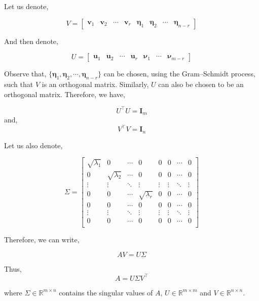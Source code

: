 \documentclass[a4paper]{article}
\begin{document}
Let us denote,

\begin{equation}
V = \begin{bmatrix}
\boldsymbol{v}_1 & \boldsymbol{v}_2 & \cdots & \boldsymbol{v}_r &  \boldsymbol{\eta}_1 & \boldsymbol{\eta}_2 & \cdots & \boldsymbol{\eta}_{n-r}
\end{bmatrix} 
\end{equation}

And then denote,

\begin{equation}
U = \begin{bmatrix}
\boldsymbol{u}_1 & \boldsymbol{u}_2 & \cdots & \boldsymbol{u}_r & \boldsymbol{\nu}_1 & \cdots & \boldsymbol{\nu}_{m-r}
\end{bmatrix}
\end{equation}

Observe that, $\{ \boldsymbol{\eta}_1, \boldsymbol{\eta}_2, \cdots, \boldsymbol{\eta}_{n-r} \}$ can be chosen, using the Gram–Schmidt process, such that $V$ is an orthogonal matrix. Similarly, $U$ can also be chosen to be an orthogonal matrix. Therefore, we have,

\begin{equation}
U^{\top}U = \boldsymbol{I}_m
\end{equation}
and,
\begin{equation}
V^{\top}V = \boldsymbol{I}_n
\end{equation}

Let us also denote,

\begin{equation}
\Sigma = \begin{bmatrix}
\sqrt{\lambda_1} & 0 & \cdots &0 & 0 & 0 & \cdots & 0 \\
0 & \sqrt{\lambda_2} & \cdots & 0 & 0 & 0 & \cdots & 0\\
\vdots & \vdots & \ddots & \vdots & \vdots & \vdots & \ddots & \vdots \\
0 & 0 & \cdots & \sqrt{\lambda_r} & 0 & 0 & \cdots & 0 \\
0 & 0 & \cdots & 0 & 0 & 0 & \cdots & 0 \\
\vdots & \vdots & \ddots & \vdots & \vdots & \vdots & \ddots & \vdots \\
0 & 0 & \cdots & 0 & 0 & 0 & \cdots & 0 \\
\end{bmatrix}
\end{equation}

Therefore, we can write,

\begin{equation}
AV = U\Sigma 
\end{equation}

Thus,
\begin{equation}
A = U\Sigma V^{\top} 
\end{equation}

where $\Sigma \in \mathbb{R}^{m \times n}$ contains the singular values of $A$, $U \in \mathbb{R}^{m \times m}$ and $V \in \mathbb{R}^{n \times n}$. 
\end{document}
